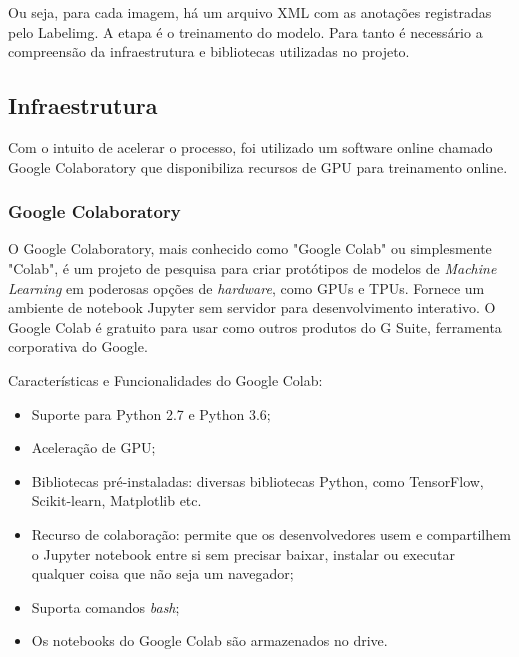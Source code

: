 Ou seja, para cada imagem, há um arquivo XML com as anotações registradas pelo Labelimg. A etapa é o treinamento do modelo. Para tanto é necessário a compreensão da infraestrutura e bibliotecas utilizadas no projeto.


\subsection{Infraestrutura}

Com o intuito de acelerar o processo, foi utilizado um software online chamado Google Colaboratory que disponibiliza recursos de GPU para treinamento online. 


\subsubsection{Google Colaboratory}
O Google Colaboratory, mais conhecido como "Google Colab" ou simplesmente "Colab", é um projeto de pesquisa para criar protótipos de modelos de \textit{Machine Learning} em poderosas opções de \textit{hardware}, como GPUs e TPUs. Fornece um ambiente de notebook Jupyter sem servidor para desenvolvimento interativo. O Google Colab é gratuito para usar como outros produtos do G Suite, ferramenta corporativa do Google. \cite{colabdetail}
 
Características e Funcionalidades do Google Colab:

\begin{itemize}
    \item Suporte para Python 2.7 e Python 3.6;
    \item Aceleração de GPU;
    \item Bibliotecas pré-instaladas: diversas bibliotecas Python, como TensorFlow, Scikit-learn, Matplotlib etc.
    \item Recurso de colaboração: permite que os desenvolvedores usem e compartilhem o Jupyter notebook entre si sem precisar baixar, instalar ou executar qualquer coisa que não seja um navegador;
    \item Suporta comandos \textit{bash};
    \item Os notebooks do Google Colab são armazenados no drive.
\end{itemize}

